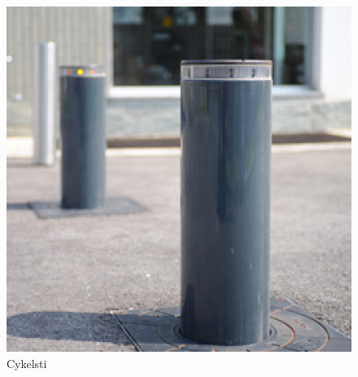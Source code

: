 \begin{figure}[htbp]
  \centering
  \begin{adjustbox}{max width=\textwidth}
    \includegraphics{figures/Billederogfigur/1.jpg}
 \end{adjustbox}
  \caption{Cykelsti}
   \label{fig:cykelsti}
\end{figure}



